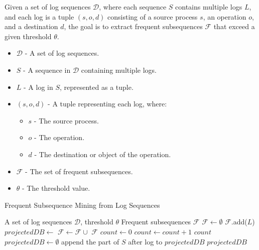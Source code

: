 Given a set of log sequences \( \mathcal{D} \), where each sequence \( S \) contains multiple logs \( L \), and each log is a tuple \( (s, o, d) \) consisting of a source process \( s \), an operation \( o \), and a destination \( d \), the goal is to extract frequent subsequences \( \mathcal{F} \) that exceed a given threshold \( \theta \).
\begin{itemize}
    \item \( \mathcal{D} \) - A set of log sequences.
    \item \( S \) - A sequence in \( \mathcal{D} \) containing multiple logs.
    \item \( L \) - A log in \( S \), represented as a tuple.
    \item \( (s, o, d) \) - A tuple representing each log, where:
    \begin{itemize}
        \item \( s \) - The source process.
        \item \( o \) - The operation.
        \item \( d \) - The destination or object of the operation.
    \end{itemize}
    \item \( \mathcal{F} \) - The set of frequent subsequences.
    \item \( \theta \) - The threshold value.
\end{itemize}


\begin{algorithm}
\caption{Frequent Subsequence Mining from Log Sequences}
\begin{algorithmic}[1]
\Require A set of log sequences \( \mathcal{D} \), threshold \( \theta \)
\Ensure Frequent subsequences \( \mathcal{F} \)
    \State $\mathcal{F} \gets \emptyset$
                \State $\mathcal{F}$.add($L$)
                \State $projectedDB \gets$ 
                \State $\mathcal{F} \gets \mathcal{F} \cup$ 
            \EndIf
        \EndFor
    \EndFor
    \State \Return $\mathcal{F}$
\EndFunction
\Statex
{}
    \State $count \gets 0$
            \State $count \gets count + 1$
        \EndIf
    \EndFor
    \State \Return $count$
\EndFunction
\Statex
{}
    \State $projectedDB \gets \emptyset$
            \State append the part of $S$ after log to $projectedDB$
        \EndIf
    \EndFor
    \State \Return $projectedDB$
\EndFunction
\end{algorithmic}
\end{algorithm}


